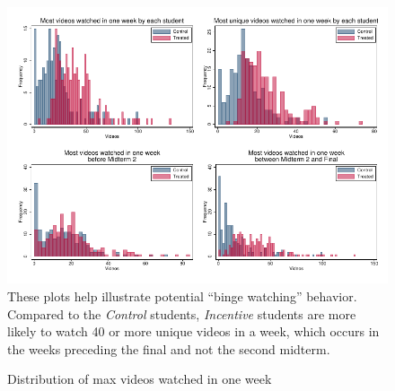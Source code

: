 \documentclass[12pt]{article}
\begin{document}
\clearpage
\begin{figure}[t]
\begin{center}
\caption{Distribution of max videos watched in one week}
\label{hist_binge}
\includegraphics[width=1\textwidth, angle=0]{../plots/hist_maxweek}
\footnotesize These plots help illustrate potential ``binge watching'' behavior.
Compared to the \textit{Control} students, \textit{Incentive} students are more likely to watch 40 or more unique videos in a week, which occurs in the weeks preceding the final and not the second midterm.
\end{center}
\end{figure}

\end{document}
